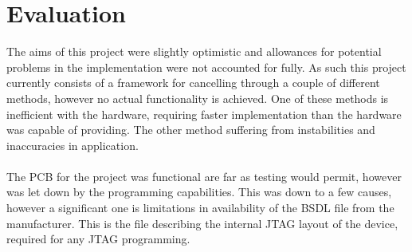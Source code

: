 \section{Evaluation}

The aims of this project were slightly optimistic and allowances for potential problems in the implementation were not accounted for fully.
As such this project currently consists of a framework for cancelling through a couple of different methods, however no actual functionality is achieved.
One of these methods is inefficient with the hardware, requiring faster implementation than the hardware was capable of providing.
The other method suffering from instabilities and inaccuracies in application.
\\
\\
The PCB for the project was functional are far as testing would permit, however was let down by the programming capabilities.
This was down to a few causes, however a significant one is limitations in availability of the BSDL file from the manufacturer.
This is the file describing the internal JTAG layout of the device, required for any JTAG programming.
